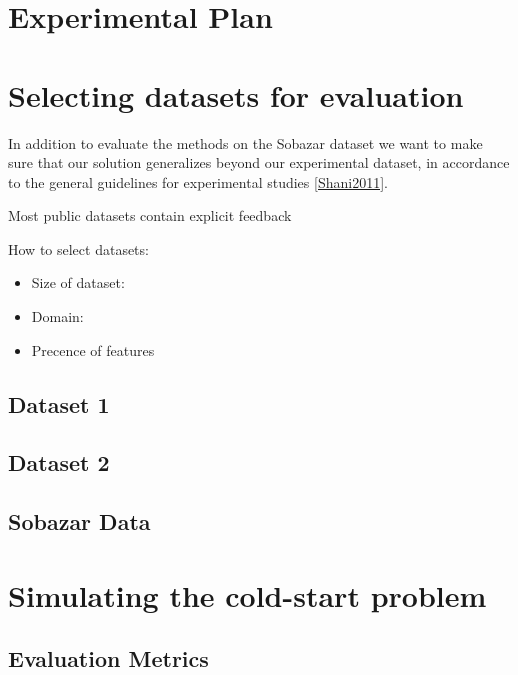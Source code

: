 
\section{Experimental Plan}



\section{Selecting datasets for evaluation}

In addition to evaluate the methods on the Sobazar dataset we want to make sure that our solution generalizes beyond our experimental dataset, in accordance to the general guidelines for experimental studies \ref{Shani2011}.

Most public datasets contain explicit feedback

How to select datasets:
\begin{itemize}
\item Size of dataset:
\item Domain:
\item Precence of features
\end{itemize}



\subsection{Dataset 1}
\subsection{Dataset 2}
\subsection{Sobazar Data}




\section{Simulating the cold-start problem}



\subsection{Evaluation Metrics}
